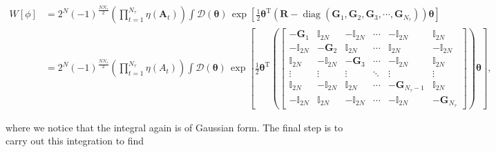 \documentclass{article}
\begin{document}
\begin{align}
	W\left[ \phi \right]  &= 2^{N} (-1)^{\frac{N N_\tau}{2}}
	\left(\prod_{t=1}^{N_\tau} \eta\left(\boldsymbol{A}_t\right)\right) \int \mathcal{D}\!\left(\boldsymbol{\theta}\right)\,
	\exp\!\left[
	\frac{1}{2}\boldsymbol{\theta}^{\mathrm T}
	\left(
	\boldsymbol{R}
	-
	\operatorname{diag}\!\left(
	\boldsymbol{G}_1,\boldsymbol{G}_2,\boldsymbol{G}_3,\cdots,\boldsymbol{G}_{N_\tau}
	\right)
	\right)
	\boldsymbol{\theta}
	\right]
	\nonumber \\
	&= 2^{N} (-1)^{\frac{N N_\tau}{2}}
	\left(\prod_{t=1}^{N_\tau} \eta\left(A_t\right)\right) \int \mathcal{D}\!\left(\boldsymbol{\theta}\right)\,
	\exp\!\left[
	\frac{1}{2}\boldsymbol{\theta}^{\mathrm T}
	\left(
	\begin{bmatrix}
		-\boldsymbol{G}_1 & \mathbb{I}_{2N} & -\mathbb{I}_{2N} & \cdots & -\mathbb{I}_{2N} & \mathbb{I}_{2N} \\
		-\mathbb{I}_{2N} & -\boldsymbol{G}_2 & \mathbb{I}_{2N} & \cdots & \mathbb{I}_{2N} & -\mathbb{I}_{2N} \\
		\mathbb{I}_{2N} & -\mathbb{I}_{2N} & -\boldsymbol{G}_3 & \cdots & -\mathbb{I}_{2N} & \mathbb{I}_{2N} \\
		\vdots & \vdots & \vdots & \ddots & \vdots & \vdots \\
		\mathbb{I}_{2N} & -\mathbb{I}_{2N} & \mathbb{I}_{2N} & \cdots & -\boldsymbol{G}_{N_\tau-1} & \mathbb{I}_{2N} \\
		-\mathbb{I}_{2N} & \mathbb{I}_{2N} & -\mathbb{I}_{2N} & \cdots & -\mathbb{I}_{2N} & -\boldsymbol{G}_{N_\tau}
	\end{bmatrix}
	\right)
	\boldsymbol{\theta}
	\right],
\end{align}



where we notice that the integral again is of Gaussian form. The final step is to carry out this integration to find
\end{document}
